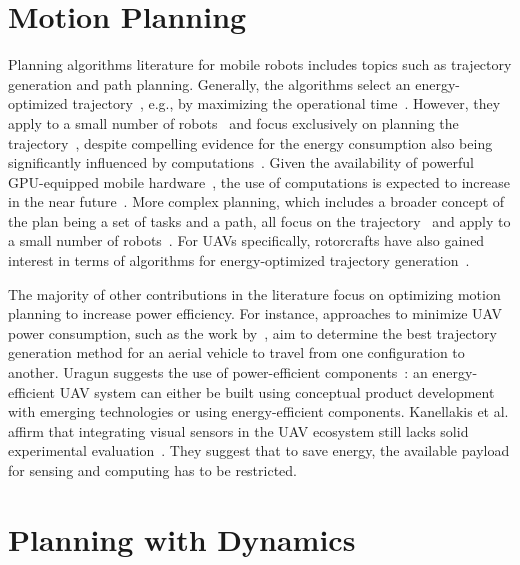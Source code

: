 \section{\color{cyan}Motion Planning}
\label{sec:soa-motion-pl}

Planning algorithms literature for mobile robots includes topics such as trajectory generation and path planning. Generally, the algorithms select an energy-optimized trajectory~\cite{mei2004energy}, e.g., by maximizing the operational time~\cite{wahab2015energy}. However, they apply to a small number of robots~\cite{kim2005energy} and focus exclusively on planning the trajectory~\cite{kim2008minimum}, despite compelling evidence for the energy consumption also being significantly influenced by computations~\cite{mei2005case}. Given the availability of powerful GPU-equipped mobile hardware~\cite{rizvi2017general}, the use of computations is expected to increase in the near future~\cite{abramov2012real,satria2016real,jaramillo2019visual}. More complex planning, which includes a broader concept of the plan being a set of tasks and a path, all focus on the trajectory~\cite{mei2005case,mei2006deployment} and apply to a small number of robots~\cite{sadrpour2013mission,sadrpour2013experimental}. For UAVs specifically, rotorcrafts have also gained interest in terms of algorithms for energy-optimized trajectory generation~\cite{morbidi2016minimum,kreciglowa2017energy}. 

The majority of other contributions in the literature focus on optimizing motion planning to increase power efficiency. For instance, approaches to minimize UAV power consumption, such as the work by~\citep{kreciglowa2017energy}, aim to determine the best trajectory generation method for an aerial vehicle to travel from one configuration to another. Uragun suggests the use of power-efficient components~\citep{uragun2011energy}: an energy-efficient UAV system can either be built using conceptual product development with emerging technologies or using energy-efficient components. Kanellakis et al. affirm that integrating visual sensors in the UAV ecosystem still lacks solid experimental evaluation~\citep{kanellakis2017survey}. They suggest that to save energy, the available payload for sensing and computing has to be restricted.

\section{\color{orange}Planning with Dynamics}
\label{sec:soa-dynamics-pl}

